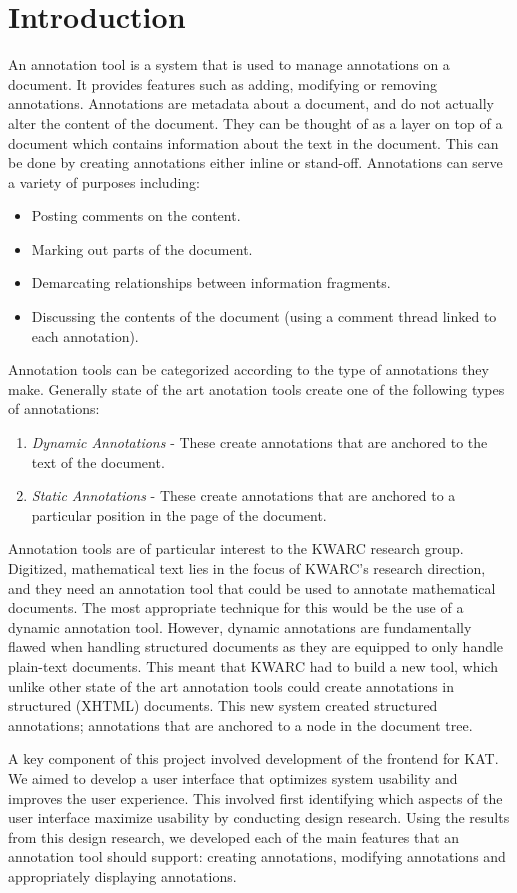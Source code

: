 \section{Introduction}
  An annotation tool is a system that is used to manage annotations on a document. It provides features such as adding, modifying or removing annotations. Annotations are metadata about a document, and do not actually alter the content of the document. They can be thought of as a layer on top of a document which contains information about the text in the document. This can be done by creating annotations either inline or stand-off. Annotations can serve a variety of purposes including:
  \begin{itemize}
    \item Posting comments on the content.
    \item Marking out parts of the document.
    \item Demarcating relationships between information fragments.
    \item Discussing the contents of the document (using a comment thread linked to each annotation).
  \end{itemize}

  Annotation tools can be categorized according to the type of annotations they make. Generally state of the art anotation tools create one of the following types of annotations:
  \begin{enumerate}
    \item \textit{Dynamic Annotations} - These create annotations that are anchored to the text of the document.
    \item \textit{Static Annotations} - These create annotations that are anchored to a particular position in the page of the document. 
  \end{enumerate}

  Annotation tools are of particular interest to the KWARC research group. Digitized, mathematical text lies in the focus of KWARC's research direction, and they need an annotation tool that could be used to annotate mathematical documents. The most appropriate technique for this would be the use of a dynamic annotation tool. However, dynamic annotations are fundamentally flawed when handling structured documents as they are equipped to only handle plain-text documents. This meant that KWARC had to build a new tool, which unlike other state of the art annotation tools could create annotations in structured (XHTML) documents. This new system created structured annotations; annotations that are anchored to a node in the document tree.

  A key component of this project involved development of the frontend for KAT. We aimed to develop a user interface that optimizes system usability and improves the user experience. This involved first identifying which aspects of the user interface maximize usability by conducting design research. Using the results from this design research, we developed each of the main features that an annotation tool should support: creating annotations, modifying annotations and appropriately displaying annotations.